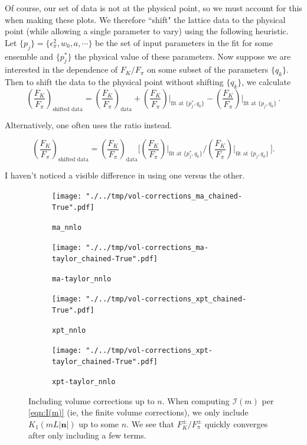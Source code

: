 \documentclass[prd,tightenlines,preprintnumbers,showpacs,superscriptaddress,notitlepage,eqsecnum,floatfix,notitlepage]{revtex4-1}
\begin{document}
Of course, our set of data is not at the physical point, so we must account for this when making these plots. We therefore ``shift" the lattice data to the physical point (while allowing a single parameter to vary) using the following heuristic. Let $\{p_j\} = \{\epsilon^2_\pi, w_0, a, \cdots\}$ be the set of input parameters in the fit for some ensemble and $\{p^*_j\}$ the physical value of these parameters. Now suppose we are interested in the dependence of $F_K / F_\pi$ on some subset of the parameters $\{q_k\}$. Then to shift the data to the physical point without shifting $\{q_k\}$, we calculate
\begin{equation}
\left( \frac{F_K}{F_\pi} \right)_\text{shifted data} =
\left( \frac{F_K}{F_\pi} \right)_\text{data}
+ \left( \frac{F_K}{F_\pi} \right) \bigg|_{\text{fit at } \{p^*_j, q_k\}}
- \left( \frac{F_K}{F_\pi} \right) \bigg|_{\text{fit at } \{p_j, q_k\}} \, .
\end{equation}

Alternatively, one often uses the ratio instead.

\begin{equation}
\left( \frac{F_K}{F_\pi} \right)_\text{shifted data} =
\left( \frac{F_K}{F_\pi} \right)_\text{data}
\Bigg[ \left( \frac{F_K}{F_\pi} \right) \bigg|_{\text{fit at } \{p^*_j, q_k\}}
\bigg/ \left( \frac{F_K}{F_\pi} \right) \bigg|_{\text{fit at } \{p_j, q_k\}} \, \Bigg] .
\end{equation}

I haven't noticed a visible difference in using one versus the other.

\begin{figure}
	\centering
	\begin{subfigure}[b]{.45\linewidth}
		\texttt{[image: "./../tmp/vol-corrections\_ma\_chained-True".pdf]}
		\caption{\texttt{ma\_nnlo}}
	\end{subfigure}
	\begin{subfigure}[b]{.45\linewidth}
		\texttt{[image: "./../tmp/vol-corrections\_ma-taylor\_chained-True".pdf]}
		\caption{\texttt{ma-taylor\_nnlo}}
	\end{subfigure}

	\begin{subfigure}[b]{.45\linewidth}
		\texttt{[image: "./../tmp/vol-corrections\_xpt\_chained-True".pdf]}
		\caption{\texttt{xpt\_nnlo}}
	\end{subfigure}
	\begin{subfigure}[b]{.45\linewidth}
		\texttt{[image: "./../tmp/vol-corrections\_xpt-taylor\_chained-True".pdf]}
		\caption{\texttt{xpt-taylor\_nnlo}}
	\end{subfigure}
	\caption{Including volume corrections up to $n$. When computing $\mathcal{I}(m)$ per \eqref{eqn:I(m)} (ie, the finite volume corrections), we only include $K_1(mL|\mathbf{n}|)$ up to some $n$. We see that $F_K^\pm /F_\pi^\pm$ quickly converges after only including a few terms.}
	\label{fig:volume_corrections}
\end{figure}
\end{document}
